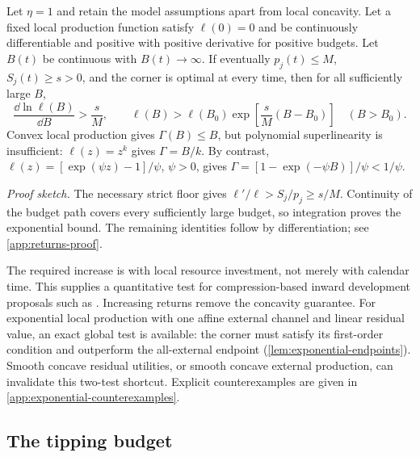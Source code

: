 \begin{proposition}
\label{prop:exponential-necessity}
Let $\eta=1$ and retain the model assumptions apart from local
concavity. Let a fixed local production function satisfy $\ell(0)=0$
and be continuously differentiable and positive with positive derivative
for positive budgets. Let $B(t)$ be continuous with $B(t)\to\infty$.
If eventually $p_j(t)\leq M$, $S_j(t)\geq s>0$, and the corner is
optimal at every time, then for all sufficiently large $B$,
\begin{equation}
 \frac{\dd\ln\ell(B)}{\dd B}>\frac{s}{M},\qquad
 \ell(B)>\ell(B_0)\exp\!\left[\frac{s}{M}(B-B_0)\right]
 \quad(B>B_0).
 \label{eq:exponential-necessity}
\end{equation}
Convex local production gives $\Gamma(B)\leq B$, but polynomial
superlinearity is insufficient: $\ell(z)=z^k$ gives $\Gamma=B/k$.
By contrast, $\ell(z)=[\exp(\psi z)-1]/\psi$, $\psi>0$, gives
$\Gamma=[1-\exp(-\psi B)]/\psi<1/\psi$.
\end{proposition}
\noindent\emph{Proof sketch.}
The necessary strict floor gives $\ell'/\ell>S_j/p_j\geq s/M$.
Continuity of the budget path covers every sufficiently large budget,
so integration proves the exponential bound. The remaining identities
follow by differentiation; see \cref{app:returns-proof}.

The required increase is with local resource investment, not merely
with calendar time. This supplies a quantitative test for
compression-based inward development proposals such as
\citet{Smart2012}. Increasing returns remove the concavity guarantee.
For exponential local production with one affine external channel and
linear residual value, an exact global test is available: the corner
must satisfy its first-order condition and outperform the all-external
endpoint (\cref{lem:exponential-endpoints}). Smooth concave residual
utilities, or smooth concave external production, can invalidate this
two-test shortcut. Explicit counterexamples are given in
\cref{app:exponential-counterexamples}.

\subsection{The tipping budget}

